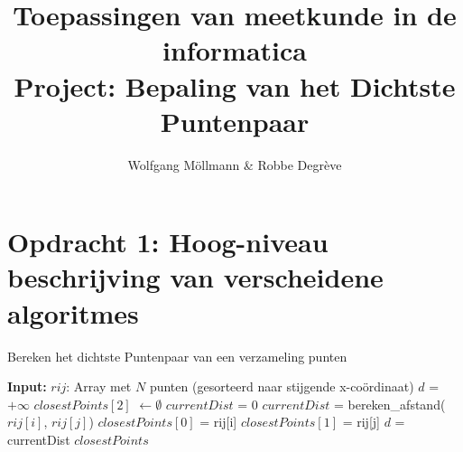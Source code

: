 \documentclass[12pt]{article}
\author{Wolfgang M\"ollmann \& Robbe Degr\`eve}
\title{Toepassingen van meetkunde in de informatica \\ Project: Bepaling van het Dichtste Puntenpaar}
\begin{document}
\maketitle

\newpage

\section{Opdracht 1: Hoog-niveau beschrijving van verscheidene algoritmes}
\begin{algorithm}
\caption{Bereken het dichtste Puntenpaar van een verzameling punten}
\begin{algorithmic}
	\STATE \textbf{Input:}  $rij$: Array met $N$ punten (gesorteerd naar stijgende x-co\"ordinaat)
  \STATE $d$ = $+\infty$
	\STATE $closestPoints[2]$ $\gets \emptyset$
  \STATE $currentDist$ = 0
        \STATE $currentDist$ = bereken\_afstand($rij[i]$, $rij[j]$)
          \STATE $closestPoints[0]$ = rij[i]
          \STATE $closestPoints[1]$ = rij[j]
          \STATE $d$ = currentDist
        \ENDIF
      \ENDFOR
    \ENDFOR
    \RETURN $closestPoints$
\end{algorithmic}
\end{algorithm}
\end{document}
